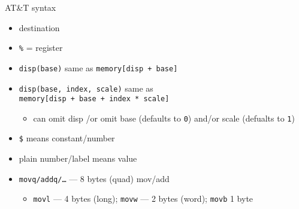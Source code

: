 \begin{frame}{AT\&T syntax}
    \begin{itemize}
    \item destination 
    \item {\tt \%} = register
    \item {\tt disp(base)} same as {\tt memory[disp + base]}
    \item {\tt disp(base, index, scale)} same as \\ {\tt memory[disp + base + index * scale]}
        \begin{itemize}
        \item can omit disp /or omit base (defaults to {\tt 0}) and/or scale (defualts to {\tt 1})
        \end{itemize}
    \item {\tt \$} means constant/number
    \item plain number/label means value 
    \item {\tt movq/addq/\ldots} --- 8 bytes (quad) mov/add
        \begin{itemize}
            \item {\tt movl} --- 4 bytes (long); {\tt movw} --- 2 bytes (word); {\tt movb} 1 byte
        \end{itemize}
    \end{itemize}
\end{frame}
